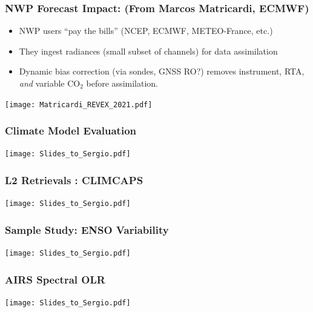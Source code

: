 \documentclass[10pt,t]{beamer}
\begin{document}
\begin{frame}
  \frametitle{NWP Forecast Impact: \small (From Marcos Matricardi, ECMWF)}
  \vspace{-0.1in}
  \begin{small}
  \begin{itemize}
  \item NWP users ``pay the bills'' (NCEP, ECMWF, METEO-France, etc.)
  \item They ingest radiances (small subset of channels) for data assimilation
  \item Dynamic bias correction (via sondes, GNSS RO?) removes instrument, RTA, \textit{and} variable CO$_2$ before assimilation.
\end{itemize}
  \end{small}
  \vspace{-0.45in}
  \texttt{[image: Matricardi\_REVEX\_2021.pdf]}
\end{frame}
\begin{frame}
\frametitle{Climate Model Evaluation}  
\vspace{-0.35in}
\begin{center}
\texttt{[image: Slides\_to\_Sergio.pdf]}
\end{center}
\end{frame}
\begin{frame}
\frametitle{L2 Retrievals : CLIMCAPS}  
\vspace{-0.35in}
\begin{center}
\texttt{[image: Slides\_to\_Sergio.pdf]}
\end{center}
\end{frame}
\begin{frame}
\frametitle{Sample Study: ENSO Variability}  
\vspace{-0.35in}
\begin{center}
\texttt{[image: Slides\_to\_Sergio.pdf]}
\end{center}
\end{frame}
\begin{frame}
\frametitle{AIRS Spectral OLR}  
\vspace{-0.35in}
\begin{center}
\texttt{[image: Slides\_to\_Sergio.pdf]}
\end{center}
\end{frame}
\end{document}
